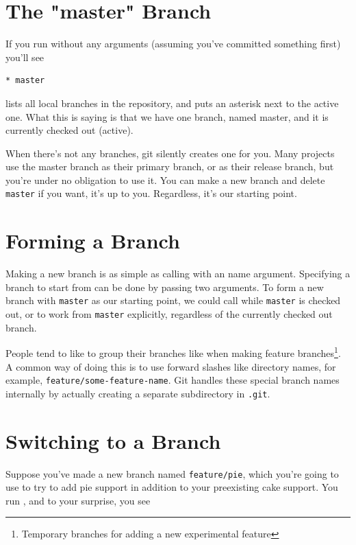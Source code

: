 \documentclass[11pt,letterpaper,twoside]{report}
\begin{document}
\section{The "master" Branch}

If you run  without any arguments (assuming you've committed
something first) you'll see

\begin{lstlisting}[numbers=none]
* master
\end{lstlisting}

 lists all local branches in the repository, and puts an
asterisk next to the active one. What this is saying is that we have one branch,
named master, and it is currently checked out (active).

When there's not any branches, git silently creates one for you. Many projects
use the master branch as their primary branch, or as their release branch, but
you're under no obligation to use it. You can make a new branch and delete
\texttt{master} if you want, it's up to you. Regardless, it's our starting
point.

\section{Forming a Branch}

Making a new branch is as simple as calling  with an name
argument. Specifying a branch to start from can be done by passing two
arguments. To form a new branch with \texttt{master} as our starting point, we
could call  while \texttt{master} is checked
out, or  to work from \texttt{master}
explicitly, regardless of the currently checked out branch.

People tend to like to group their branches like when making feature
branches\footnote{Temporary branches for adding a new experimental feature}. A
common way of doing this is to use forward slashes like directory names, for
example, \texttt{feature/some-feature-name}. Git handles these special branch
names internally by actually creating a separate subdirectory in \texttt{.git}.

\section{Switching to a Branch}

Suppose you've made a new branch named \texttt{feature/pie}, which you're going
to use to try to add pie support in addition to your preexisting cake support.
You run , and to your surprise, you see
\end{document}
